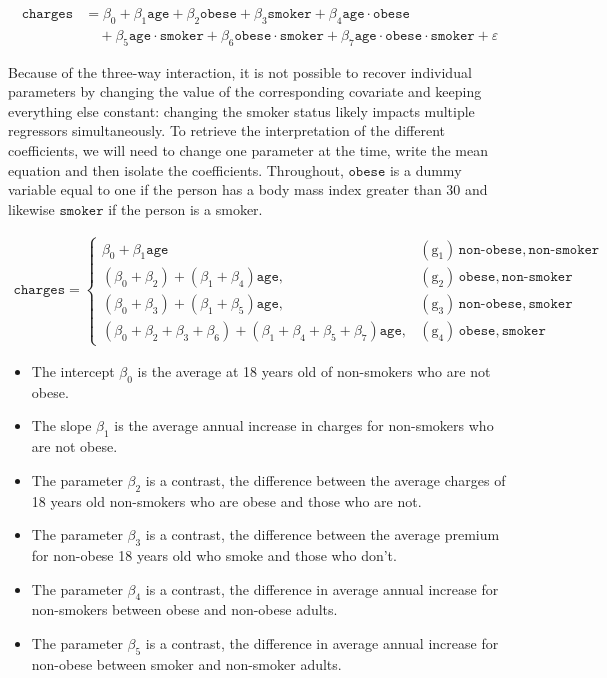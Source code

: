 \documentclass[
  11pt,
  letterpaper,
]{book}
\providecommand{\tightlist}{%
  \setlength{\itemsep}{0pt}\setlength{\parskip}{0pt}}
\theoremstyle{definition}
\theoremstyle{definition}
\theoremstyle{definition}
\theoremstyle{remark}
\begin{document}
\begin{align*}
\texttt{charges} &= \beta_{0} + \beta_{1}\texttt{age} + \beta_{2}\texttt{obese} + \beta_{3}\texttt{smoker} + 
\beta_{4}\texttt{age} \cdot \texttt{obese} \\&\quad + \beta_{5}\texttt{age} \cdot \texttt{smoker} + \beta_{6}\texttt{obese} \cdot \texttt{smoker} + \beta_{7}\texttt{age} \cdot \texttt{obese} \cdot \texttt{smoker} + \varepsilon
\end{align*}

Because of the three-way interaction, it is not possible to recover individual parameters by changing the value of the corresponding covariate and keeping everything else constant: changing the smoker status likely impacts multiple regressors simultaneously. To retrieve the interpretation of the different coefficients, we will need to change one parameter at the time, write the mean equation and then isolate the coefficients. Throughout, \(\texttt{obese}\) is a dummy variable equal to one if the person has a body mass index greater than 30 and likewise \(\texttt{smoker}\) if the person is a smoker.

\begin{align*}
\texttt{charges}  = 
\begin{cases}
\beta_{0} + \beta_{1}\texttt{age}  & (\mathrm{g}_1)\, \texttt{non-obese}, \texttt{non-smoker} \\
(\beta_{0} + \beta_{2}) + (\beta_{1} + \beta_{4})\texttt{age},  & (\mathrm{g}_2)\,  \texttt{obese}, \texttt{non-smoker} \\
(\beta_{0} + \beta_{3}) + (\beta_{1} + \beta_{5})\texttt{age},  & (\mathrm{g}_3)\,  \texttt{non-obese}, \texttt{smoker} \\
(\beta_{0} + \beta_{2} + \beta_{3}+ \beta_{6}) + (\beta_{1} + \beta_{4} +\beta_{5} + \beta_7)\texttt{age},  & (\mathrm{g}_4)\,  \texttt{obese}, \texttt{smoker}
\end{cases}
\end{align*}

\begin{itemize}
\tightlist
\item
  The intercept \(\beta_0\) is the average at 18 years old of non-smokers who are not obese.
\item
  The slope \(\beta_1\) is the average annual increase in charges for non-smokers who are not obese.
\item
  The parameter \(\beta_2\) is a contrast, the difference between the average charges of 18 years old non-smokers who are obese and those who are not.
\item
  The parameter \(\beta_3\) is a contrast, the difference between the average premium for non-obese 18 years old who smoke and those who don't.
\item
  The parameter \(\beta_4\) is a contrast, the difference in average annual increase for non-smokers between obese and non-obese adults.
\item
  The parameter \(\beta_5\) is a contrast, the difference in average annual increase for non-obese between smoker and non-smoker adults.
\end{itemize}
\end{document}
